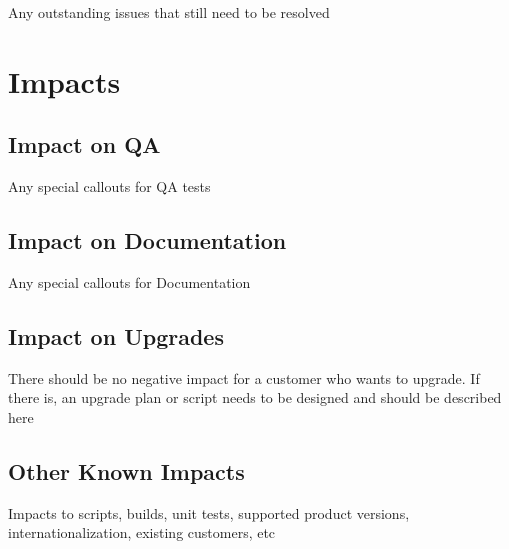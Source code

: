 \documentclass{article}
\begin{document}
Any outstanding issues that still need to be resolved

\section{Impacts}

\subsection{Impact on QA}

Any special callouts for QA tests

\subsection{Impact on Documentation} 

Any special callouts for Documentation

\subsection{Impact on Upgrades}

There should be no negative impact for a customer who wants to upgrade.  If there is, an upgrade plan or script needs to be designed and should be described here

\subsection{Other Known Impacts}

Impacts to scripts, builds, unit tests, supported product versions, internationalization, existing customers, etc
\end{document}
